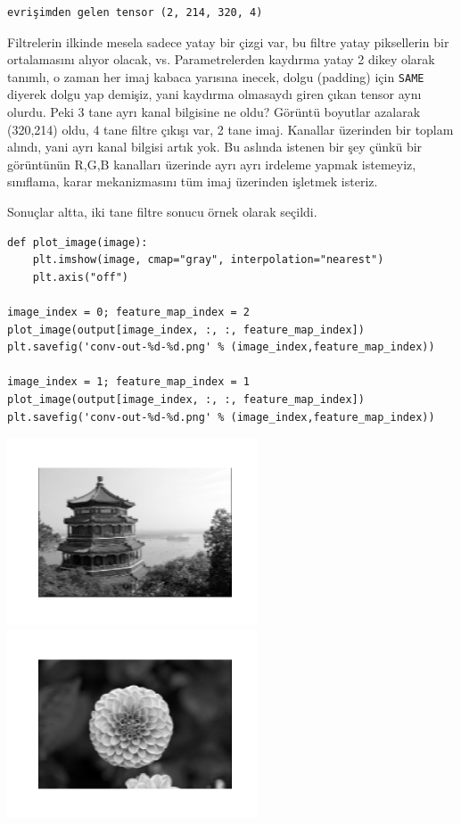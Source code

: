 \documentclass[12pt,fleqn]{article}\usepackage{../../common}
\begin{document}
\begin{verbatim}
evrişimden gelen tensor (2, 214, 320, 4)
\end{verbatim}

Filtrelerin ilkinde mesela sadece yatay bir çizgi var, bu filtre yatay
piksellerin bir ortalamasını alıyor olacak, vs. Parametrelerden kaydırma
yatay 2 dikey olarak tanımlı, o zaman her imaj kabaca yarısına inecek,
dolgu (padding) için \verb!SAME! diyerek dolgu yap demişiz, yani kaydırma
olmasaydı giren çıkan tensor aynı olurdu. Peki 3 tane ayrı kanal bilgisine
ne oldu? Görüntü boyutlar azalarak (320,214) oldu, 4 tane filtre çıkışı
var, 2 tane imaj. Kanallar üzerinden bir toplam alındı, yani ayrı kanal
bilgisi artık yok. Bu aslında istenen bir şey çünkü bir görüntünün R,G,B
kanalları üzerinde ayrı ayrı irdeleme yapmak istemeyiz, sınıflama, karar
mekanizmasını tüm imaj üzerinden işletmek isteriz.

Sonuçlar altta, iki tane filtre sonucu örnek olarak seçildi.

\begin{verbatim}
def plot_image(image):
    plt.imshow(image, cmap="gray", interpolation="nearest")
    plt.axis("off")
    
image_index = 0; feature_map_index = 2
plot_image(output[image_index, :, :, feature_map_index])
plt.savefig('conv-out-%d-%d.png' % (image_index,feature_map_index))

image_index = 1; feature_map_index = 1
plot_image(output[image_index, :, :, feature_map_index])
plt.savefig('conv-out-%d-%d.png' % (image_index,feature_map_index))
\end{verbatim}

\includegraphics[width=20em]{conv-out-0-2.png}
\includegraphics[width=20em]{conv-out-1-1.png}
\end{document}
